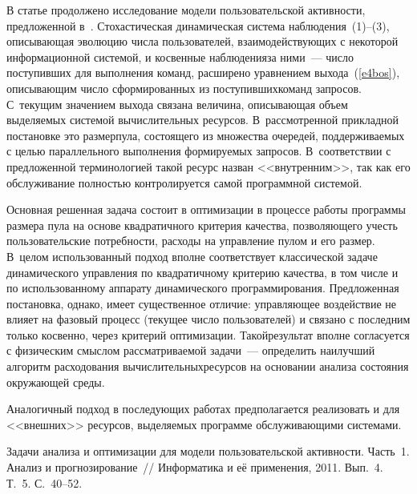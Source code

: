 \begin{multicols}{2}
  В статье продолжено исследование модели пользовательской активности, предложенной 
в~\cite{1bos}. Стохастическая динамическая система наблюдения~(1)--(3), описывающая 
эволюцию числа пользователей, взаимодействующих с некоторой информационной 
системой, и косвенные наблюдения\linebreak за ними~--- чис\-ло поступивших для выполнения 
команд, расширено уравнением выхода~(\ref{e4bos}), описывающим число сформированных 
из поступивших\linebreak команд запросов. С~текущим значением выхода связана величина, 
описывающая объем вы\-де\-ля\-емых сис\-те\-мой вычислительных ресурсов. В~рас\-смот\-рен\-ной 
прикладной постановке это размер\linebreak пула, состоящего из множества очередей, 
поддерживаемых с целью параллельного выполнения формиру\-емых запросов. 
В~соответствии с предложенной терминологией такой ресурс назван <<внут\-рен\-ним>>, так 
как его обслуживание полностью контролируется самой программной системой.
  
  Основная решенная задача состоит в оптимизации в процессе работы программы размера 
пула на основе квадратичного критерия качества, позволяющего учесть пользовательские 
потребности, расходы на управление пулом и его размер. В~целом использованный подход 
вполне соответствует классической задаче динамического управления по квадратичному 
критерию качества, в том числе  и по использованному аппарату динамического 
программирования. Предложенная постановка, однако, имеет существенное отличие: 
управляющее воздействие не влияет на фазовый процесс (текущее число пользователей) и 
связано с последним только косвенно, через критерий оптимизации. Такой\linebreak результат вполне 
согласуется с физическим смыс\-лом рассматриваемой задачи~--- определить наилучший 
алгоритм расходования вычислительных\linebreak ресурсов на основании анализа состояния 
окружающей \mbox{среды}.
  
  Аналогичный подход в последующих работах предполагается реализовать и для 
<<внешних>> ресурсов, выделяемых программе обслуживающими системами.

{\small\frenchspacing
{%
\begin{thebibliography}{99}

 Задачи анализа и оптимизации для модели пользовательской активности. 
Часть~1. Анализ и прогнозирование~// Информатика и её применения, 2011. Вып.~4. Т.~5. 
С.~40--52.


\end{thebibliography}}}
\end{multicols}
